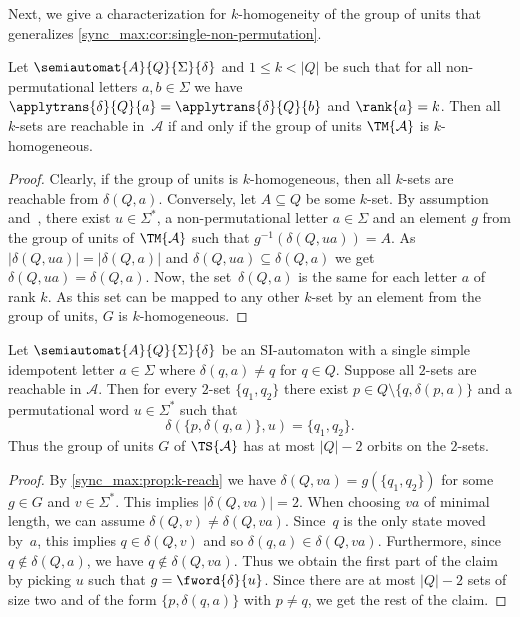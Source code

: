 Next, we give a characterization for $k$-homogeneity of the group of units
that generalizes \cref{sync_max:cor:single-non-permutation}.

\begin{proposition}
	\label{sync_max:cor:single_non_permutational_letter}
	Let $\semiautomat{A}{Q}{\Sigma}{\delta}$
	and $1 \le k < |Q|$
	be such that for all non-permutational letters $a,b \in \Sigma$
	we have $\applytrans{\delta}{Q}{a} = \applytrans{\delta}{Q}{b}$
	and $\rank{a} = k$. Then all $k$-sets are reachable in~$\mathcal A$
	if and only if the group of units $\TM{\mathcal A}$ is $k$-homogeneous.
\end{proposition}
\begin{proof}
	Clearly, if the group of units is $k$-homogeneous,
	then all $k$-sets are reachable from $\delta(Q, a)$.
	Conversely, let $A \subseteq Q$ be some $k$-set.
	By assumption and~,
	there exist $u \in \Sigma^*$, a non-permutational letter $a \in \Sigma$
	and an element $g$ from the group of units of $\TM{\mathcal A}$
	such that $g^{-1}(\delta(Q, ua)) = A$.
	As $|\delta(Q, ua)| = |\delta(Q, a)|$ and $\delta(Q, ua) \subseteq \delta(Q, a)$
	we get $\delta(Q, ua) = \delta(Q, a)$.
	Now, the set~$\delta(Q, a)$ is the same for each letter $a$ of rank $k$.
	As this set can be mapped to any other $k$-set
	by an element from the group of units, $G$ is $k$-homogeneous.
\end{proof}

\begin{proposition} \label{sync_max:subsets:prop:num-two-set-orbits}
	Let $\semiautomat{A}{Q}{\Sigma}{\delta}$
	be an SI-automaton with a single simple idempotent letter $a \in \Sigma$
	where $\delta(q, a) \ne q$ for $q \in Q$.
	Suppose all $2$-sets are reachable in $\mathcal A$.	
	Then for every $2$-set $\{q_1, q_2\}$ there exist $p \in Q \setminus \{q,\delta(p,a)\}$
	and a permutational word $u \in \Sigma^*$ such that
	\[
	 \delta(\{p, \delta(q, a)\}, u) = \{q_1, q_2\}. 
	\]
	Thus the group of units $G$ of $\TS{\mathcal A}$
	has at most $|Q|- 2$ orbits on the $2$-sets.
\end{proposition}
\begin{proof}
	By \cref{sync_max:prop:k-reach}
	we have $\delta(Q, va) = g(\{q_1, q_2\})$
	for some $g \in G$ and $v \in \Sigma^*$.
	This implies $|\delta(Q, va)| = 2$.
	When choosing $va$ of minimal length,
	we can assume $\delta(Q, v) \ne \delta(Q, va)$.
	Since~$q$ is the only state moved by~$a$,
	this implies $q \in \delta(Q, v)$
	and so $\delta(q, a) \in \delta(Q, va)$.
	Furthermore, since $q \notin \delta(Q, a)$,
	we have $q \notin \delta(Q, va)$.
	Thus we obtain the first part of the claim by picking $u$ such
	that $g = \fword{\delta}{u}$.
	Since there are at most $|Q| - 2$
	sets of size two and of the form $\{ p, \delta(q, a) \}$ with $p \ne q$,
	we get the rest of the claim.
\end{proof}